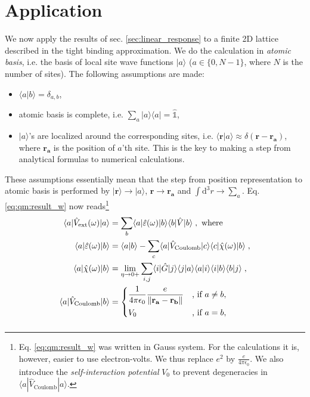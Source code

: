 \documentclass[a4paper,12pt]{article}
\begin{document}
\section{Application}
    We now apply the results of sec. \ref{sec:linear_response} to a finite 2D lattice described in the tight binding approximation. We do the calculation in \textit{atomic basis}, i.e. the basis of local site wave functions $|a\rangle$ ($a \in \{0, N-1\}$, where $N$ is the number of sites). The following assumptions are made:
    \begin{itemize}
    \item $\langle a | b \rangle = \delta_{a,b}$,
    \item atomic basis is complete, i.e. $\sum_{a} |a\rangle\! \langle a| = \hat{\mathds{1}}$,
    \item $| a \rangle$'s are localized around the corresponding sites, i.e. $\langle \mathbf{r} | a \rangle \approx \delta(\mathbf{r} - \mathbf{r_a})$, where $\mathbf{r_a}$ is the position of $a$'th site. This is the key to making a step from analytical formulas to numerical calculations.
    \end{itemize}
    These assumptions essentially mean that the step from position representation to atomic basis is performed by $|\mathbf{r}\rangle \to |a\rangle$, $\mathbf{r} \to \mathbf{r_a}$ and $\int\!\text{d}^3 r \to \sum_{a}$. Eq. \eqref{eq:qm:result_w} now reads\footnote{ %
Eq. \eqref{eq:qm:result_w} was written in Gauss system. For the calculations it is, however, easier to use electron-volts. We thus replace $e^2$ by $\frac{e}{4\pi\epsilon_0}$. We also introduce the \textit{self-interaction potential} $V_0$ to prevent degeneracies in $\langle a | \hat V_\text{Coulomb} | a \rangle$.
}
    \begin{equation} \label{eq:appl:result_w}
    \begin{aligned}
        \langle a | \hat V_\text{ext}(\omega) | a \rangle &= \sum_{b} \langle a | \hat \varepsilon(\omega) | b \rangle \langle b | \hat V | b \rangle \; , \text{ where} \\
        \langle a | \hat\varepsilon(\omega) | b \rangle
            &= \langle a | b \rangle - \sum_{c} \langle a | \hat V_\text{Coulomb} | c \rangle \langle c | \hat\chi(\omega) | b \rangle \; , \\
        \langle a | \hat \chi(\omega) | b \rangle 
            &= \lim_{\eta \to 0+} \sum_{i,j} \langle i | \hat G | j \rangle \langle j | a \rangle \langle a | i \rangle \langle i | b \rangle \langle b | j \rangle\; , \\
        \langle a | \hat V_\text{Coulomb} | b \rangle 
            &= \begin{dcases} 
                \frac{1}{4\pi\epsilon_0} \frac{e}{\|\mathbf{r_a} - \mathbf{r_b}\|} & \text{, if } a \neq b, \\
                V_0 & \text{, if } a = b,
                \end{dcases}
    \end{aligned}
    \end{equation}
        \begin{equation*}
    \end{equation*}
    
\end{document}
